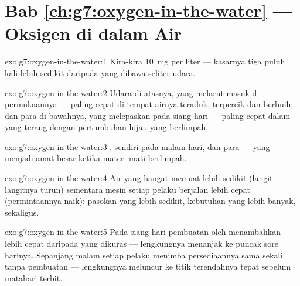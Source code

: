 \section*{Bab \ref{ch:g7:oxygen-in-the-water} --- Oksigen di dalam Air}

\begin{solution}{exo:g7:oxygen-in-the-water:1}
Kira-kira \qty{10}{mg} per liter --- kasarnya tiga puluh kali lebih
sedikit daripada yang dibawa seliter udara.
\end{solution}

\begin{solution}{exo:g7:oxygen-in-the-water:2}
Udara di atasnya, yang melarut masuk di permukaannya --- paling cepat
di tempat airnya teraduk, terpercik dan berbuih; dan para  di
bawahnya, yang melepaskan  pada siang hari --- paling cepat
dalam  yang terang dengan pertumbuhan hijau yang berlimpah.
\end{solution}

\begin{solution}{exo:g7:oxygen-in-the-water:3}
 ,   sendiri pada malam hari, dan
 para  --- yang menjadi amat besar ketika materi
mati berlimpah.
\end{solution}

\begin{solution}{exo:g7:oxygen-in-the-water:4}
Air yang hangat memuat lebih sedikit  (langit-langitnya
turun) sementara mesin setiap pelaku  berjalan lebih cepat
(permintaannya naik): pasokan yang lebih sedikit, kebutuhan yang lebih
banyak, sekaligus.
\end{solution}

\begin{solution}{exo:g7:oxygen-in-the-water:5}
Pada siang hari pembuatan oleh  menambahkan  lebih
cepat daripada yang dikuras  --- lengkungnya menanjak ke
puncak sore harinya. Sepanjang malam setiap pelaku  menimba
persediaannya sama sekali tanpa pembuatan --- lengkungnya meluncur ke
titik terendahnya tepat sebelum matahari terbit.
\end{solution}

